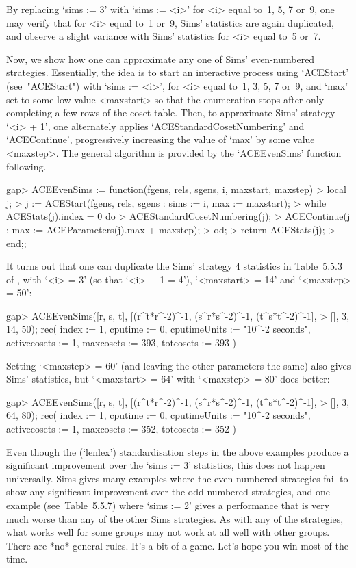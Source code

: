 By replacing `sims := 3' with `sims := <i>' for <i> equal to~1,  5,  7
or~9, one may verify that for <i> equal to~1  or~9,  Sims'  statistics
are again  duplicated,  and  observe  a  slight  variance  with  Sims'
statistics for <i> equal to~5 or~7.

Now, we show how one can approximate any one of  Sims'  even-numbered
strategies. Essentially, the idea is to start  an  interactive  {\ACE}
process using `ACEStart' (see~"ACEStart") with `sims := <i>', for  <i>
equal to~1, 3, 5, 7 or~9, and `max' set to some low  value  <maxstart>
so that the enumeration stops after only completing a few rows of  the
coset table. Then, to  approximate  Sims'  strategy  `<i>  +  1',  one
alternately  applies  `ACEStandardCosetNumbering'  and  `ACEContinue',
progressively increasing the value of `max' by some  value  <maxstep>.
The general  algorithm  is  provided  by  the  `ACEEvenSims'  function
following.

\beginexample
gap> ACEEvenSims := function(fgens, rels, sgens, i, maxstart, maxstep)
>      local j;
>      j := ACEStart(fgens, rels, sgens : sims := i, max := maxstart);
>      while ACEStats(j).index = 0 do
>        ACEStandardCosetNumbering(j);
>        ACEContinue(j : max := ACEParameters(j).max + maxstep);
>      od;
>      return ACEStats(j);
>    end;;
\endexample

It turns out that one can duplicate the Sims' strategy 4 statistics in
Table~5.5.3 of \cite{Sim94}, with `<i> = 3' (so that `<i> + 1  =  4'),
`<maxstart> = 14' and `<maxstep> = 50':

\beginexample
gap> ACEEvenSims([r, s, t], [(r^t*r^-2)^-1, (s^r*s^-2)^-1, (t^s*t^-2)^-1],
>                [], 3, 14, 50);
rec( index := 1, cputime := 0, cputimeUnits := "10^-2 seconds", 
  activecosets := 1, maxcosets := 393, totcosets := 393 )
\endexample

Setting `<maxstep> = 60' (and leaving the other parameters  the  same)
also gives Sims' statistics, but `<maxstart> = 64' with  `<maxstep>  =
80' does better:

\beginexample
gap> ACEEvenSims([r, s, t], [(r^t*r^-2)^-1, (s^r*s^-2)^-1, (t^s*t^-2)^-1],
>                [], 3, 64, 80);
rec( index := 1, cputime := 0, cputimeUnits := "10^-2 seconds", 
  activecosets := 1, maxcosets := 352, totcosets := 352 )
\endexample

Even though the (`lenlex') standardisation steps in the above examples
produce a significant improvement over the  `sims  :=  3'  statistics,
this  does  not  happen  universally.  Sims  \cite{Sim94}  gives  many
examples  where  the  even-numbered  strategies  fail  to   show   any
significant improvement over  the  odd-numbered  strategies,  and  one
example (see~Table~5.5.7) where `sims := 2' gives a  performance  that
is very much worse than any of the other Sims strategies. As with  any
of the strategies, what works well for some groups may not work at all
well with other groups. There are *no* general rules. It's a bit of  a
game. Let's hope you win most of the time.

